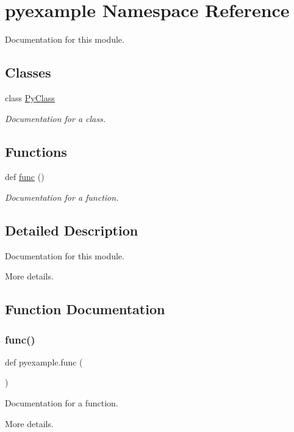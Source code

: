 \hypertarget{namespacepyexample}{}\section{pyexample Namespace Reference}
\label{namespacepyexample}


Documentation for this module.  


\subsection*{Classes}
\begin{DoxyCompactItemize}
\item 
class \mbox{\hyperlink{classpyexample_1_1_py_class}{Py\+Class}}
\begin{DoxyCompactList}\small\item\em Documentation for a class. \end{DoxyCompactList}\end{DoxyCompactItemize}
\subsection*{Functions}
\begin{DoxyCompactItemize}
\item 
def \mbox{\hyperlink{namespacepyexample_a2daf35288bc9d0a1d4233ab18b553451}{func}} ()
\begin{DoxyCompactList}\small\item\em Documentation for a function. \end{DoxyCompactList}\end{DoxyCompactItemize}


\subsection{Detailed Description}
Documentation for this module. 

More details. 

\subsection{Function Documentation}
\mbox{\label{namespacepyexample_a2daf35288bc9d0a1d4233ab18b553451}} 
\subsubsection{\texorpdfstring{func()}{func()}}
{\footnotesize\ttfamily def pyexample.\+func (\begin{DoxyParamCaption}{ }\end{DoxyParamCaption})}



Documentation for a function. 

More details. 